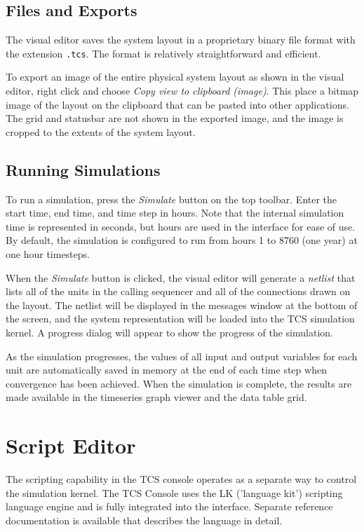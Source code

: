 \documentclass{article}
\begin{document}
\subsection{Files and Exports}

The visual editor saves the system layout in a proprietary binary file format with the extension \texttt{.tcs}.  The format is relatively straightforward and efficient.

To export an image of the entire physical system layout as shown in the visual editor, right click and choose \emph{Copy view to clipboard (image)}.  This place a bitmap image of the layout on the clipboard that can be pasted into other applications.  The grid and statusbar are not shown in the exported image, and the image is cropped to the extents of the system layout.

\subsection{Running Simulations}

To run a simulation, press the \emph{Simulate} button on the top toolbar.  Enter the start time, end time, and time step in hours.  Note that the internal simulation time is represented in seconds, but hours are used in the interface for ease of use.  By default, the simulation is configured to run from hours 1 to 8760 (one year) at one hour timesteps.

When the \emph{Simulate} button is clicked, the visual editor will generate a \emph{netlist} that lists all of the units in the calling sequencer and all of the connections drawn on the layout.  The netlist will be displayed in the messages window at the bottom of the screen, and the system representation will be loaded into the TCS simulation kernel. A progress dialog will appear to show the progress of the simulation.

As the simulation progresses, the values of all input and output variables for each unit are automatically saved in memory at the end of each time step when convergence has been achieved.  When the simulation is complete, the results are made available in the timeseries graph viewer and the data table grid.

\section{Script Editor}

The scripting capability in the TCS console operates as a separate way to control the simulation kernel.  The TCS Console uses the LK ('language kit') scripting language engine and is fully integrated into the interface.  Separate reference documentation is available that describes the language in detail. 
\end{document}
